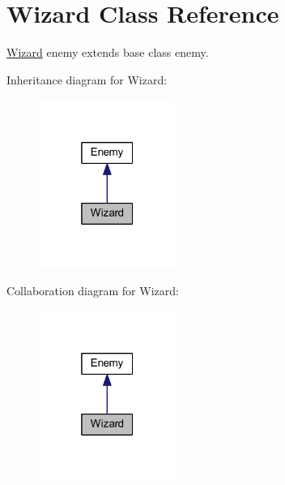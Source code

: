 \hypertarget{class_wizard}{}\section{Wizard Class Reference}
\label{class_wizard}


\mbox{\hyperlink{class_wizard}{Wizard}} enemy extends base class enemy.  




Inheritance diagram for Wizard\+:\nopagebreak
\begin{figure}[H]
\begin{center}
\leavevmode
\includegraphics[width=127pt]{class_wizard__inherit__graph}
\end{center}
\end{figure}


Collaboration diagram for Wizard\+:\nopagebreak
\begin{figure}[H]
\begin{center}
\leavevmode
\includegraphics[width=127pt]{class_wizard__coll__graph}
\end{center}
\end{figure}
